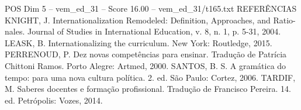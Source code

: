 \begin{textsample}{POS Dim 5 – vem\_ed\_31 – Score 16.00 – vem\_ed\_31/t165.txt}
REFERÊNCIAS KNIGHT, J.
Internationalization Remodeled: Definition, Approaches, and Ratio- nales.
Journal of Studies in International Education, v. 8, n. 1, p. 5-31, 2004.
LEASK, B.
Internationalizing the curriculum.
New York: Routledge, 2015.
PERRENOUD, P.
Dez novas competências para ensinar.
Tradução de Patrícia Chittoni Ramos.
Porto Alegre: Artmed, 2000.
SANTOS, B.
S.
A gramática do tempo: para uma nova cultura política. 2. ed.
São Paulo: Cortez, 2006.
TARDIF, M.
Saberes docentes e formação profissional.
Tradução de Francisco Pereira. 14. ed.
Petrópolis: Vozes, 2014.

\end{textsample}
